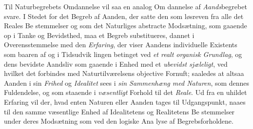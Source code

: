 Til Naturbegrebets Omdannelse vil saa en analog Om\-%
dannelse af \emph{Aands}begrebet svare. I Stedet for det Begreb
af Aanden, der satte den som løsreven fra alle det Reales Be\-%
stemmelser og som det Naturliges abstracte Modsætning, som
gaaende op i Tanke og Bevidsthed, maa et Begreb substitueres,
dannet i Overensstemmelse med den \emph{Erfaring}, der viser
Aandens individuelle Existents som baaren af og i Tidsudvik\-%
lingen betinget ved \emph{et realt organisk Grundlag}, og dens
bevidste Aandsliv som gaaende i Enhed med et \emph{ubevidst
sjæleligt}, ved hvilket det forbindes med Naturtilværelsens
objective Fornuft; saaledes at altsaa Aanden i sin \emph{Frihed} og
\emph{Idealitet} sees i \emph{sin Sammenhæng med Naturen}, som
dennes Fuldendelse, og som staaende i \emph{væsentligt} Forhold
til det \emph{Reale}. Ud fra en uhildet Erfaring vil der, hvad enten
 \setcounter{footnote}{0}%
Naturen eller Aanden tages til Udgangspunkt, naaes til den
samme væsentlige Enhed af Idealitetens og Realitetens Be\-%
stemmelser under deres Modsætning som ved den logiske Ana\-%
lyse af Begrebsforholdene.

